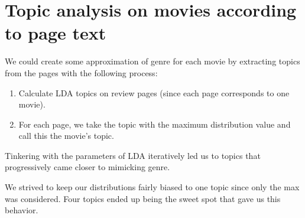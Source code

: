 \documentclass[11pt]{article}
\begin{document}
\section{Topic analysis on movies according to page text}

We could create some approximation of genre for each movie by extracting topics from the pages with the following process:

\begin{enumerate}
    \item Calculate LDA topics on review pages (since each page corresponds to one movie).
    \item For each page, we take the topic with the maximum distribution value and call this the movie's topic.
\end{enumerate}

Tinkering with the parameters of LDA iteratively led us to topics that progressively came closer to mimicking genre.\newline

We strived to keep our distributions fairly biased to one topic since only the max was considered. Four topics
ended up being the sweet spot that gave us this behavior.\newline
\end{document}
